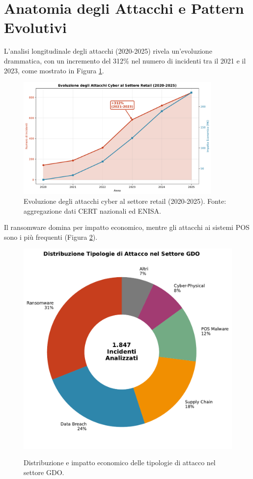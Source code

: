 \section{Anatomia degli Attacchi e Pattern Evolutivi}
L'analisi longitudinale degli attacchi (2020-2025) rivela un'evoluzione drammatica, con un incremento del 312\% nel numero di incidenti tra il 2021 e il 2023, come mostrato in Figura \ref{fig:cyber_evolution}.

\begin{figure}[htbp]
\centering
\includegraphics[width=0.9\textwidth]{thesis_figures/cap2/fig_2_1_cyber_evolution.pdf}
\caption{Evoluzione degli attacchi cyber al settore retail (2020-2025). Fonte: aggregazione dati CERT nazionali ed ENISA.}
\label{fig:cyber_evolution}
\end{figure}

Il ransomware domina per impatto economico, mentre gli attacchi ai sistemi POS sono i più frequenti (Figura \ref{fig:attack_types}).

\begin{figure}[htbp]
\centering
\includegraphics[width=\textwidth]{thesis_figures/cap2/fig_2_2_attack_types.pdf}
\caption{Distribuzione e impatto economico delle tipologie di attacco nel settore GDO.}\autocite{CPR2025}
\label{fig:attack_types}
\end{figure}


